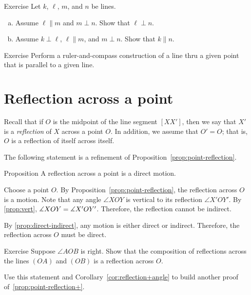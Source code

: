\begin{thm}[!]{Exercise}\label{ex:perp-perp}
Let $k$, $\ell$, $m$, and $n$ be lines.
\begin{enumerate}[(a)]
 \item\label{ex:perp-perp:a}
 Assume $\ell\parallel m$ and $m\perp n$.
 Show that $\ell\perp n$.
 \item\label{ex:perp-perp:b}
 Assume $k\perp \ell$, $\ell\parallel m$, and $m\perp n$.
 Show that $k\parallel n$.
\end{enumerate}

\end{thm}

\begin{thm}{Exercise}\label{ex:construction-parallel}
Perform a ruler-and-compass construction of a line thru a given point that is parallel to a given line.
\end{thm}

\section{Reflection across a point}

Recall that if $O$ is the midpoint of the line segment $[XX']$,
then we say that $X'$ is a \emph{reflection} of $X$ across a point $O$.
In addition, we assume that $O'=O$; that is, $O$ is a reflection of itself across itself.

The following statement is a refinement of Proposition~\ref{prop:point-reflection}.

\begin{thm}[\abs]{Proposition}\label{prop:point-reflection+}
A reflection across a point is a direct motion.
\end{thm}

Choose a point $O$.
By Proposition~\ref{prop:point-reflection}, the reflection across $O$ is a motion.
Note that any angle $\angle XOY$ is vertical to its reflection $\angle X'OY'$.
By \ref{prop:vert}, $\measuredangle XOY\z=\measuredangle X'OY'$.
Therefore, the reflection cannot be indirect.

By \ref{prop:direct-indirect}, any motion is either direct or indirect.
Therefore, the reflection across $O$ must be direct.
\qeds

\begin{thm}{Exercise}\label{ex:reflections}
Suppose $\angle AOB$ is right.
Show that the composition of reflections across the lines $(OA)$ and $(OB)$ is a reflection across $O$.

Use this statement and Corollary~\ref{cor:reflection+angle} to build another proof of~\ref{prop:point-reflection+}.
\end{thm}

